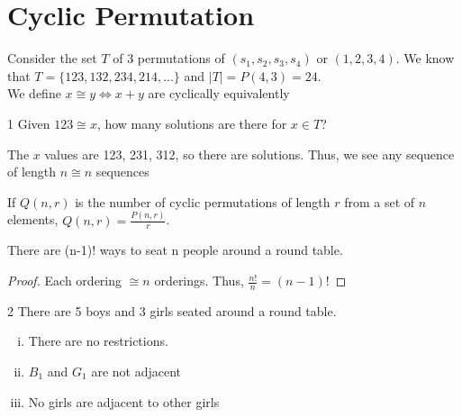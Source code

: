 \documentclass[11pt,twosided]{article}
\begin{document}
\section{Cyclic Permutation}

Consider the set $T$ of 3 permutations of $(s_1, s_2, s_3, s_4)$ or $(1, 2, 3, 4)$. We know that $T = \{ 123, 132, 234, 214, ... \}$ and $|T| = P(4, 3) = 24$.\\

We define $x \cong y \iff x + y $ are cyclically equivalently 

\begin{problem}
    1 Given $123 \cong x$, how many solutions are there for $x \in T$?
\end{problem}

\begin{solution}
    The $x$ values are 123, 231, 312, so there are  solutions. Thus, we see any sequence of length $n \cong n$ sequences
\end{solution}

\begin{theorem}
    If $Q(n, r)$ is the number of cyclic permutations of length $r$ from a set of $n$ elements, $Q(n, r) = \frac{P(n, r)}{r}$.
\end{theorem}

\begin{theorem}
    There are (n-1)! ways to seat n people around a round table.
\end{theorem}

\begin{proof}
    Each ordering $\cong n$ orderings. Thus, $\frac{n!}{n} = (n-1)!$
\end{proof}

\begin{problem}
    2 There are 5 boys and 3 girls seated around a round table.
    \begin{enumerate}[(i)]
        \item There are no restrictions.
        \item $B_1$ and $G_1$ are not adjacent
        \item No girls are adjacent to other girls
    \end{enumerate}
\end{problem}
\end{document}
